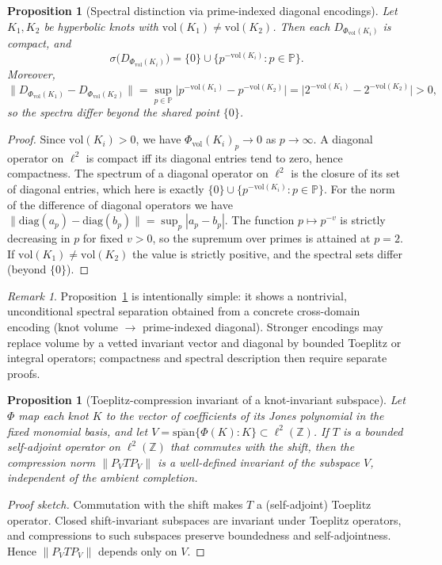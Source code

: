 \documentclass[11pt]{article}
\newtheorem{proposition}[theorem]{Proposition}
\theoremstyle{definition}
\theoremstyle{remark}
\newtheorem{remark}[theorem]{Remark}
\newcommand{\Z}{\mathbb{Z}}
\newcommand{\PP}{\mathbb{P}} %
\newcommand{\1}{\mathbf{1}}
\begin{document}
\begin{proposition}[Spectral distinction via prime-indexed diagonal encodings]
\label{prop:diagonal}
Let $K_1,K_2$ be hyperbolic knots with $\mathrm{vol}(K_1)\neq \mathrm{vol}(K_2)$. Then each $D_{\Phi_{\mathrm{vol}}(K_i)}$ is compact, and
\[
  \sigma\big(D_{\Phi_{\mathrm{vol}}(K_i)}\big)=\{0\}\cup\{p^{-\mathrm{vol}(K_i)}:p\in\PP\}.
\]
Moreover,
\[
  \big\|D_{\Phi_{\mathrm{vol}}(K_1)}-D_{\Phi_{\mathrm{vol}}(K_2)}\big\|=\sup_{p\in\PP}\big|p^{-\mathrm{vol}(K_1)}-p^{-\mathrm{vol}(K_2)}\big|=\big|2^{-\mathrm{vol}(K_1)}-2^{-\mathrm{vol}(K_2)}\big|>0,
\]
so the spectra differ beyond the shared point $\{0\}$.
\end{proposition}
\begin{proof}
Since $\mathrm{vol}(K_i)>0$, we have $\Phi_{\mathrm{vol}}(K_i)_p\to 0$ as $p\to\infty$. A diagonal operator on $\ell^2$ is compact iff its diagonal entries tend to zero, hence compactness. The spectrum of a diagonal operator on $\ell^2$ is the closure of its set of diagonal entries, which here is exactly $\{0\}\cup\{p^{-\mathrm{vol}(K_i)}:p\in\PP\}$. For the norm of the difference of diagonal operators we have $\|\mathrm{diag}(a_p)-\mathrm{diag}(b_p)\|=\sup_p|a_p-b_p|$. The function $p\mapsto p^{-v}$ is strictly decreasing in $p$ for fixed $v>0$, so the supremum over primes is attained at $p=2$. If $\mathrm{vol}(K_1)\neq\mathrm{vol}(K_2)$ the value is strictly positive, and the spectral sets differ (beyond $\{0\}$).
\end{proof}

\begin{remark}
Proposition~\ref{prop:diagonal} is intentionally simple: it shows a nontrivial, unconditional spectral separation obtained from a concrete cross-domain encoding (knot volume $\to$ prime-indexed diagonal). Stronger encodings may replace volume by a vetted invariant vector and diagonal by bounded Toeplitz or integral operators; compactness and spectral description then require separate proofs.
\end{remark}
\begin{proposition}[Toeplitz-compression invariant of a knot-invariant subspace]\label{prop:toeplitz}
Let \(\Phi\) map each knot \(K\) to the vector of coefficients of its Jones polynomial in the fixed monomial basis, and let \(V=\overline{\mathrm{span}}\{\Phi(K):K\}\subset \ell^2(\Z)\).
If \(T\) is a bounded self-adjoint operator on \(\ell^2(\Z)\) that commutes with the shift, then the compression norm \(\|P_V T P_V\|\) is a well-defined invariant of the subspace \(V\), independent of the ambient completion.
\end{proposition}
\begin{proof}[Proof sketch]
Commutation with the shift makes \(T\) a (self-adjoint) Toeplitz operator. Closed shift-invariant subspaces are invariant under Toeplitz operators, and compressions to such subspaces preserve boundedness and self-adjointness. Hence \(\|P_V T P_V\|\) depends only on \(V\).
\end{proof}
\end{document}
